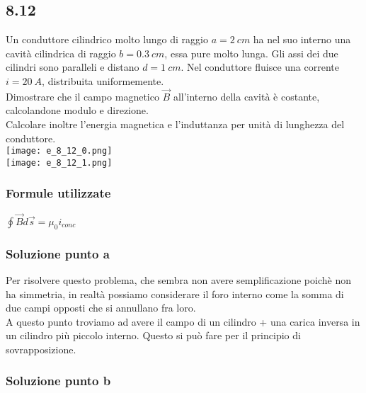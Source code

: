 \documentclass[../../main.tex]{subfiles}
\begin{document}
\subsection*{8.12}
Un conduttore cilindrico molto lungo di raggio $a = 2\ cm$ ha nel suo interno una cavità cilindrica di raggio $b = 0.3\ cm$, essa pure molto lunga. Gli assi dei due cilindri sono paralleli e distano $d = 1\ cm$. Nel conduttore fluisce una corrente $i = 20\ A$, distribuita uniformemente.\\
Dimostrare che il campo magnetico $\vec{B}$ all'interno della cavità è costante, calcolandone modulo e direzione.\\
Calcolare inoltre l'energia magnetica e l'induttanza per unità di lunghezza del conduttore.\\
\texttt{[image: e\_8\_12\_0.png]}\\
\texttt{[image: e\_8\_12\_1.png]}
\subsubsection*{Formule utilizzate}
$\oint\vec{B}d\vec{s}=\mu_0i_{conc}$
\subsubsection*{Soluzione punto a}
Per risolvere questo problema, che sembra non avere semplificazione poichè non ha simmetria, in realtà possiamo considerare il foro interno come la somma di due campi opposti che si annullano fra loro.\\
A questo punto troviamo ad avere il campo di un cilindro + una carica inversa in un cilindro più piccolo interno. 
Questo si può fare per il principio di sovrapposizione.

\subsubsection*{Soluzione punto b}
\newpage
\end{document}
